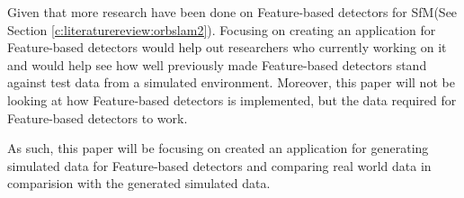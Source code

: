 Given that more research have been done on Feature-based detectors for SfM(See Section \ref{c:literaturereview:orbslam2}). Focusing on creating an application for Feature-based detectors would help out researchers who currently working on it and would help see how well previously made Feature-based detectors stand against test data from a simulated environment. Moreover, this paper will not be looking at how Feature-based detectors is implemented, but the data required for Feature-based detectors to work.

As such, this paper will be focusing on created an application for generating simulated data for Feature-based detectors and comparing real world data in comparision with the generated simulated data.